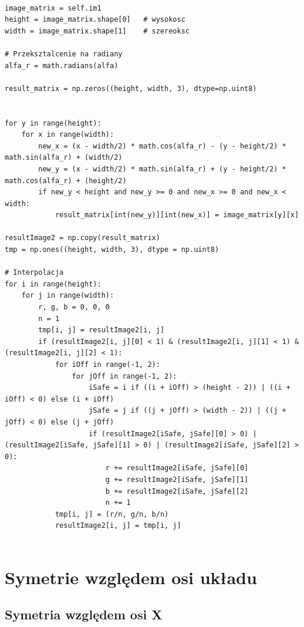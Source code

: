 \documentclass[final,a4paper,openany,12pt]{mwbk}
\begin{document}
\begin{lstlisting}[caption=Obracanie obrazu o dowolny kąt]

image_matrix = self.im1
height = image_matrix.shape[0]   # wysokosc
width = image_matrix.shape[1]    # szereoksc

# Przeksztalcenie na radiany
alfa_r = math.radians(alfa)

result_matrix = np.zeros((height, width, 3), dtype=np.uint8)


for y in range(height):
    for x in range(width): 
        new_x = (x - width/2) * math.cos(alfa_r) - (y - height/2) * math.sin(alfa_r) + (width/2)
        new_y = (x - width/2) * math.sin(alfa_r) + (y - height/2) * math.cos(alfa_r) + (height/2)
        if new_y < height and new_y >= 0 and new_x >= 0 and new_x < width:
            result_matrix[int(new_y)][int(new_x)] = image_matrix[y][x]

resultImage2 = np.copy(result_matrix)
tmp = np.ones((height, width, 3), dtype = np.uint8)

# Interpolacja
for i in range(height):
    for j in range(width):
        r, g, b = 0, 0, 0
        n = 1
        tmp[i, j] = resultImage2[i, j]
        if (resultImage2[i, j][0] < 1) & (resultImage2[i, j][1] < 1) & (resultImage2[i, j][2] < 1):
            for iOff in range(-1, 2):
                for jOff in range(-1, 2):
                    iSafe = i if ((i + iOff) > (height - 2)) | ((i + iOff) < 0) else (i + iOff)
                    jSafe = j if ((j + jOff) > (width - 2)) | ((j + jOff) < 0) else (j + jOff)
                    if (resultImage2[iSafe, jSafe][0] > 0) | (resultImage2[iSafe, jSafe][1] > 0) | (resultImage2[iSafe, jSafe][2] > 0):
                        r += resultImage2[iSafe, jSafe][0]
                        g += resultImage2[iSafe, jSafe][1]
                        b += resultImage2[iSafe, jSafe][2]
                        n += 1
            tmp[i, j] = (r/n, g/n, b/n)
            resultImage2[i, j] = tmp[i, j]


\end{lstlisting}
\newpage

\section{ Symetrie względem osi układu}

\subsection*{ Symetria względem osi X}
\end{document}
